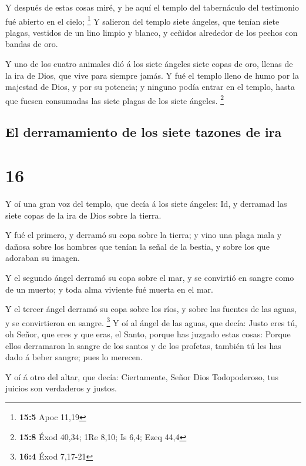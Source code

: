  Y después de estas cosas miré, y he aquí el templo del
tabernáculo del testimonio fué abierto en el cielo; \footnote{\textbf{15:5}
  Apoc 11,19}  Y salieron del templo siete ángeles, que
tenían siete plagas, vestidos de un lino limpio y blanco, y ceñidos
alrededor de los pechos con bandas de oro.

 Y uno de los cuatro animales dió á los siete ángeles siete
copas de oro, llenas de la ira de Dios, que vive para siempre jamás.
 Y fué el templo lleno de humo por la majestad de Dios, y
por su potencia; y ninguno podía entrar en el templo, hasta que fuesen
consumadas las siete plagas de los siete ángeles. \footnote{\textbf{15:8}
  Éxod 40,34; 1Re 8,10; Is 6,4; Ezeq 44,4}

\hypertarget{el-derramamiento-de-los-siete-tazones-de-ira}{%
\subsection{El derramamiento de los siete tazones de
ira}\label{el-derramamiento-de-los-siete-tazones-de-ira}}

\hypertarget{section-15}{%
\section{16}\label{section-15}}

 Y oí una gran voz del templo, que decía á los siete
ángeles: Id, y derramad las siete copas de la ira de Dios sobre la
tierra.

 Y fué el primero, y derramó su copa sobre la tierra; y vino
una plaga mala y dañosa sobre los hombres que tenían la señal de la
bestia, y sobre los que adoraban su imagen.

 Y el segundo ángel derramó su copa sobre el mar, y se
convirtió en sangre como de un muerto; y toda alma viviente fué muerta
en el mar.

 Y el tercer ángel derramó su copa sobre los ríos, y sobre
las fuentes de las aguas, y se convirtieron en sangre. \footnote{\textbf{16:4}
  Éxod 7,17-21}  Y oí al ángel de las aguas, que decía:
Justo eres tú, oh Señor, que eres y que eras, el Santo, porque has
juzgado estas cosas:  Porque ellos derramaron la sangre de
los santos y de los profetas, también tú les has dado á beber sangre;
pues lo merecen.

 Y oí á otro del altar, que decía: Ciertamente, Señor Dios
Todopoderoso, tus juicios son verdaderos y justos.

